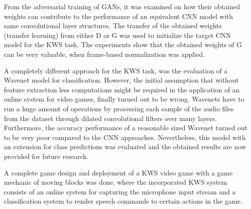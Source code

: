 From the adversarial training of GANs, it was examined on how their obtained weights can contribute to the performance of an equivalent CNN model with same convolutional layer structures.
The transfer of the obtained weights (transfer learning) from either D or G was used to initialize the target CNN model for the KWS task.
The experiments show that the obtained weights of G can be very valuable, when frame-based normalization was applied.

A completely different approach for the KWS task, was the evaluation of a Wavenet \cite{Oord2016} model for classification.
However, the initial assumption that without feature extraction less computations might be required in the application of an online system for video games, finally turned out to be wrong.
Wavenets have to run a huge amount of operations by processing each sample of the audio files from the dataset through dilated convolutional filters over many layers.
Furthermore, the accuracy performance of a reasonable sized Wavenet turned out to be very poor compared to the CNN approaches.
Nevertheless, this model with an extension for class predictions was evaluated and the obtained results are now provided for future research.

A complete game design and deployment of a KWS video game with a game mechanic of moving blocks was done, where the incorporated KWS system consists of an online system for capturing the microphone input stream and a classification system to render speech commands to certain actions in the game.